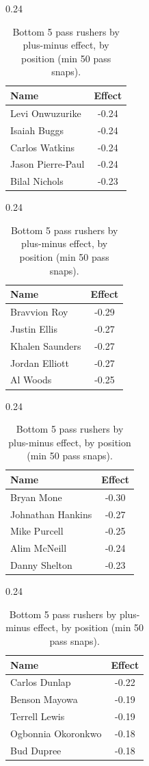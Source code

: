\begin{table}[h!]
\centering
\begin{subtable}{0.24\textwidth}
\centering
\footnotesize
\begin{tabular}{lc}
\toprule
Name & Effect \\
\midrule
Levi Onwuzurike & -0.24 \\
Isaiah Buggs & -0.24 \\
Carlos Watkins & -0.24 \\
Jason Pierre-Paul & -0.24 \\
Bilal Nichols & -0.23 \\
\bottomrule
\end{tabular}
\caption{DE}
\end{subtable}
\hfill
\begin{subtable}{0.24\textwidth}
\centering
\footnotesize
\begin{tabular}{lc}
\toprule
Name & Effect \\
\midrule
Bravvion Roy & -0.29 \\
Justin Ellis & -0.27 \\
Khalen Saunders & -0.27 \\
Jordan Elliott & -0.27 \\
Al Woods & -0.25 \\
\bottomrule
\end{tabular}
\caption{DT}
\end{subtable}
\hfill
\begin{subtable}{0.24\textwidth}
\centering
\footnotesize
\begin{tabular}{lc}
\toprule
Name & Effect \\
\midrule
Bryan Mone & -0.30 \\
Johnathan Hankins & -0.27 \\
Mike Purcell & -0.25 \\
Alim McNeill & -0.24 \\
Danny Shelton & -0.23 \\
\bottomrule
\end{tabular}
\caption{NT}
\end{subtable}
\hfill
\begin{subtable}{0.24\textwidth}
\centering
\footnotesize
\begin{tabular}{lc}
\toprule
Name & Effect \\
\midrule
Carlos Dunlap & -0.22 \\
Benson Mayowa & -0.19 \\
Terrell Lewis & -0.19 \\
Ogbonnia Okoronkwo & -0.18 \\
Bud Dupree & -0.18 \\
\bottomrule
\end{tabular}
\caption{OLB}
\end{subtable}
\caption{Bottom 5 pass rushers by plus-minus effect, by position (min 50 pass snaps).}
\label{tab:rusher_pm_bot}
\end{table}
